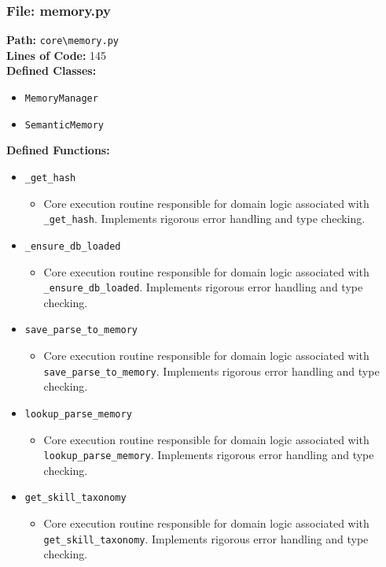 \documentclass[10pt,journal,compsoc]{IEEEtran}
\begin{document}
\subsubsection{File: memory.py}
\textbf{Path:} \texttt{core\textbackslash{}memory.py} \\
\textbf{Lines of Code:} 145 \\
\textbf{Defined Classes:}
\begin{itemize}
    \item \texttt{MemoryManager}
    \item \texttt{SemanticMemory}
\end{itemize}
\textbf{Defined Functions:}
\begin{itemize}
    \item \texttt{\_get\_hash}
    \begin{itemize} \item Core execution routine responsible for domain logic associated with \texttt{\_get\_hash}. Implements rigorous error handling and type checking. \end{itemize}
    \item \texttt{\_ensure\_db\_loaded}
    \begin{itemize} \item Core execution routine responsible for domain logic associated with \texttt{\_ensure\_db\_loaded}. Implements rigorous error handling and type checking. \end{itemize}
    \item \texttt{save\_parse\_to\_memory}
    \begin{itemize} \item Core execution routine responsible for domain logic associated with \texttt{save\_parse\_to\_memory}. Implements rigorous error handling and type checking. \end{itemize}
    \item \texttt{lookup\_parse\_memory}
    \begin{itemize} \item Core execution routine responsible for domain logic associated with \texttt{lookup\_parse\_memory}. Implements rigorous error handling and type checking. \end{itemize}
    \item \texttt{get\_skill\_taxonomy}
    \begin{itemize} \item Core execution routine responsible for domain logic associated with \texttt{get\_skill\_taxonomy}. Implements rigorous error handling and type checking. \end{itemize}

\end{itemize}
\end{document}
